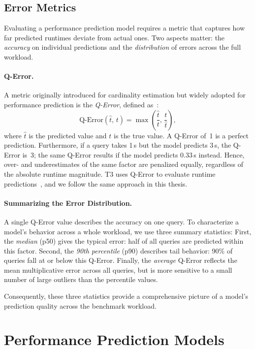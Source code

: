 \subsection{Error Metrics}

Evaluating a performance prediction model requires a metric that captures how far predicted runtimes deviate from actual ones.
Two aspects matter: the \emph{accuracy} on individual predictions and the \emph{distribution} of errors across the full workload.

\paragraph{Q-Error.}
A metric originally introduced for cardinality estimation but widely adopted for performance prediction is the \emph{Q-Error}, defined as~\parencite{qerror}:
\[
  \text{Q-Error}(\hat{t},\, t) = \max\!\left(\frac{\hat{t}}{t},\, \frac{t}{\hat{t}}\right),
\]
where $\hat{t}$ is the predicted value and $t$ is the true value.
A Q-Error of~1 is a perfect prediction.
Furthermore, if a query takes 1\,s but the model predicts 3\,s, the Q-Error is~3; the same Q-Error results if the model predicts 0.33\,s instead.
Hence, over- and underestimates of the same factor are penalized equally, regardless of the absolute runtime magnitude.
T3 uses Q-Error to evaluate runtime predictions~\parencite{t3}, and we follow the same approach in this thesis.

\paragraph{Summarizing the Error Distribution.}
A single Q-Error value describes the accuracy on one query.
To characterize a model's behavior across a whole workload, we use three summary statistics:
First, the \emph{median} (p50) gives the typical error: half of all queries are predicted within this factor.
Second, the \emph{90th percentile} (p90) describes tail behavior: 90\% of queries fall at or below this Q-Error.
Finally, the \emph{average} Q-Error reflects the mean multiplicative error across all queries, but is more sensitive to a small number of large outliers than the percentile values.

Consequently, these three statistics provide a comprehensive picture of a model's prediction quality across the benchmark workload.

\section{Performance Prediction Models}

